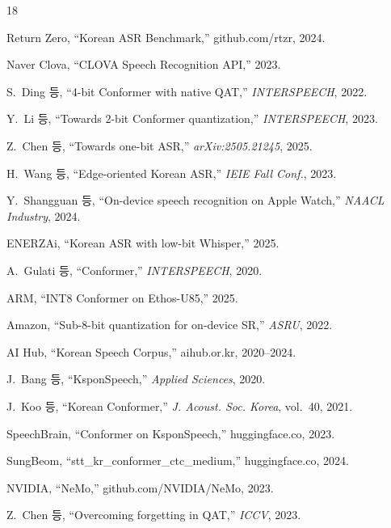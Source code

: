 \documentclass[a4paper,11pt,twocolumn]{article}
\begin{document}

\begin{thebibliography}{18}

Return Zero, ``Korean ASR Benchmark,'' github.com/rtzr, 2024.

Naver Clova, ``CLOVA Speech Recognition API,'' 2023.

S.~Ding 등, ``4-bit Conformer with native QAT,'' \textit{INTERSPEECH}, 2022.

Y.~Li 등, ``Towards 2-bit Conformer quantization,'' \textit{INTERSPEECH}, 2023.

Z.~Chen 등, ``Towards one-bit ASR,'' \textit{arXiv:2505.21245}, 2025.

H.~Wang 등, ``Edge-oriented Korean ASR,'' \textit{IEIE Fall Conf.}, 2023.

Y.~Shangguan 등, ``On-device speech recognition on Apple Watch,'' \textit{NAACL Industry}, 2024.

ENERZAi, ``Korean ASR with low-bit Whisper,'' 2025.

A.~Gulati 등, ``Conformer,'' \textit{INTERSPEECH}, 2020.

ARM, ``INT8 Conformer on Ethos-U85,'' 2025.

Amazon, ``Sub-8-bit quantization for on-device SR,'' \textit{ASRU}, 2022.

AI Hub, ``Korean Speech Corpus,'' aihub.or.kr, 2020--2024.

J.~Bang 등, ``KsponSpeech,'' \textit{Applied Sciences}, 2020.

J.~Koo 등, ``Korean Conformer,'' \textit{J. Acoust. Soc. Korea}, vol.~40, 2021.

SpeechBrain, ``Conformer on KsponSpeech,'' huggingface.co, 2023.

SungBeom, ``stt\_kr\_conformer\_ctc\_medium,'' huggingface.co, 2024.

NVIDIA, ``NeMo,'' github.com/NVIDIA/NeMo, 2023.

Z.~Chen 등, ``Overcoming forgetting in QAT,'' \textit{ICCV}, 2023.

\end{thebibliography}
\end{document}

